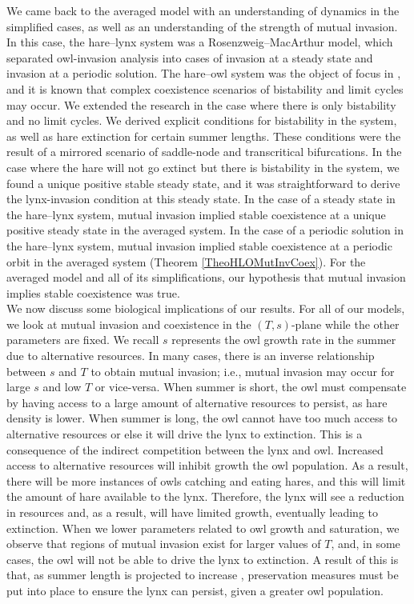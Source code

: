 \documentclass[12pt]{UOthesis}
\theoremstyle{remarkstyle}
\begin{document}
We came back to the averaged model with an understanding of dynamics in the simplified cases, as well as an understanding of the strength of mutual invasion. In this case, the hare--lynx system was a Rosenzweig--MacArthur model, which separated owl-invasion analysis into cases of invasion at a steady state and invasion at a periodic solution. The hare--owl system was the object of focus in \cite{TysonLutscher}, and it is known that complex coexistence scenarios of bistability and limit cycles may occur. We extended the research in the case where there is only bistability and no limit cycles. We derived explicit conditions for bistability in the system, as well as hare extinction for certain summer lengths. These conditions were the result of a mirrored scenario of saddle-node and transcritical bifurcations. In the case where the hare will not go extinct but there is bistability in the system, we found a unique positive stable steady state, and it was straightforward to derive the lynx-invasion condition at this steady state. In the case of a steady state in the hare--lynx system, mutual invasion implied stable coexistence at a unique positive steady state in the averaged system. In the case of a periodic solution in the hare--lynx system, mutual invasion implied stable coexistence at a periodic orbit in the averaged system (Theorem \ref{TheoHLOMutInvCoex}). For the averaged model and all of its simplifications, our hypothesis that mutual invasion implies stable coexistence was true.\\

We now discuss some biological implications of our results. For all of our models, we look at mutual invasion and coexistence in the $(T,s)$-plane while the other parameters are fixed. We recall $s$ represents the owl growth rate in the summer due to alternative resources. In many cases, there is an inverse relationship between $s$ and $T$ to obtain mutual invasion; i.e., mutual invasion may occur for large $s$ and low $T$ or vice-versa. When summer is short, the owl must compensate by having access to a large amount of alternative resources to persist, as hare density is lower. When summer is long, the owl cannot have too much access to alternative resources or else it will drive the lynx to extinction. This is a consequence of the indirect competition between the lynx and owl. Increased access to alternative resources will inhibit growth the owl population. As a result, there will be more instances of owls catching and eating hares, and this will limit the amount of hare available to the lynx. Therefore, the lynx will see a reduction in resources and, as a result, will have limited growth, eventually leading to extinction. When we lower parameters related to owl growth and saturation, we observe that regions of mutual invasion exist for larger values of $T$, and, in some cases, the owl will not be able to drive the lynx to extinction. A result of this is that, as summer length is projected to increase \cite{NOAA1, SchwartzAultBetancourt, SwannOgge}, preservation measures must be put into place to ensure the lynx can persist, given a greater owl population.\\
\end{document}
